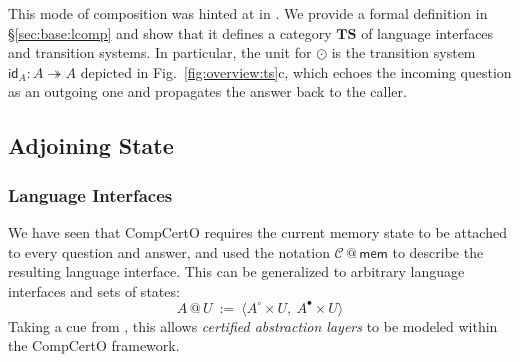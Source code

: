 \documentclass[acmsmall,screen,review,anonymous]{acmart}
\newcommand{\kw}[1]{\ensuremath{ \mathsf{#1} }}
\newcommand{\que}{\circ}
\newcommand{\ans}{\bullet}
\begin{document}
This mode of composition was hinted at in \citet{compcerto}.
We provide a formal definition in \S\ref{sec:base:lcomp}
and show that
it defines a category $\mathbf{TS}$ of
language interfaces and transition systems.
In particular,
the unit for $\odot$ is
the transition system $\kw{id}_A : A \twoheadrightarrow A$
depicted in Fig.~\ref{fig:overview:ts}c,
which echoes the incoming question as an outgoing one
and propagates the answer back to the caller.



\subsection{Adjoining State} \label{sec:overview:slift} %

\subsubsection{Language Interfaces} %

We have seen that CompCertO
requires the current memory state to be attached
to every question and answer,
and used the notation $\mathcal{C} \mathbin@ \kw{mem}$
to describe the resulting language interface.
This can be generalized to arbitrary
language interfaces and sets of states:
\[
  A \mathbin@ U \: := \:
    \langle A^\que \times U, \: A^\ans \times U \rangle
\]
Taking a cue from \citep{rbgs-cal},
this allows \emph{certified abstraction layers} to be modeled
within the CompCertO framework.

\end{document}
